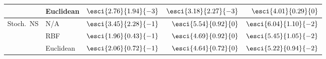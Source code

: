 \begin{table}[t]
{\begin{tabular}{llrrr}
 & Euclidean
 & $\esci{2.76}{1.94}{-3}$
 & $\esci{3.18}{2.27}{-3}$
 & \textcolor{ForestGreen}{\textbf{$\esci{4.01}{0.29}{0}$}} \\
\midrule
\multirow{3}{*}{Stoch.\ NS}
 & N/A
 & $\esci{3.45}{2.28}{-1}$
 & $\esci{5.54}{0.92}{0}$
 & $\esci{6.04}{1.10}{-2}$ \\
 & RBF
 & \textcolor{ForestGreen}{\textbf{$\esci{1.96}{0.43}{-1}$}}
 & \textcolor{Orange}{\textbf{$\esci{4.69}{0.92}{0}$}}
 & \textcolor{Orange}{\textbf{$\esci{5.45}{1.05}{-2}$}} \\
 & Euclidean
 & \textcolor{Orange}{\textbf{$\esci{2.06}{0.72}{-1}$}}
 & \textcolor{ForestGreen}{\textbf{$\esci{4.64}{0.72}{0}$}}
 & \textcolor{ForestGreen}{\textbf{$\esci{5.22}{0.94}{-2}$}} \\
\bottomrule
\end{tabular}
} %
\end{table}